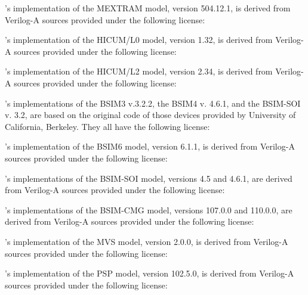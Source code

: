 \Xyce{}'s implementation of the MEXTRAM model, version 504.12.1, is derived
from Verilog-A sources provided under the following license:


\Xyce{}'s implementation of the HICUM/L0 model, version 1.32, is derived from
Verilog-A sources provided under the following license:


\Xyce{}'s implementation of the HICUM/L2 model, version 2.34, is derived from
Verilog-A sources provided under the following license:


\Xyce{}'s implementations of the BSIM3 v.3.2.2, the BSIM4 v. 4.6.1, and the
BSIM-SOI v. 3.2, are based on the original code of those devices provided by
University of California, Berkeley.  They all have the following license:


\Xyce{}'s implementation of the BSIM6 model, version 6.1.1, is derived from
Verilog-A sources provided under the following license:


\Xyce{}'s implementations of the BSIM-SOI model, versions 4.5 and 4.6.1, are
derived from Verilog-A sources provided under the following license:


\Xyce{}'s implementations of the BSIM-CMG model, versions 107.0.0 and 110.0.0,
are derived from Verilog-A sources provided under the following license:


\Xyce{}'s implementation of the MVS model, version 2.0.0, is derived from
Verilog-A sources provided under the following license:


\Xyce{}'s implementation of the PSP model, version 102.5.0, is derived from
Verilog-A sources provided under the following license:


